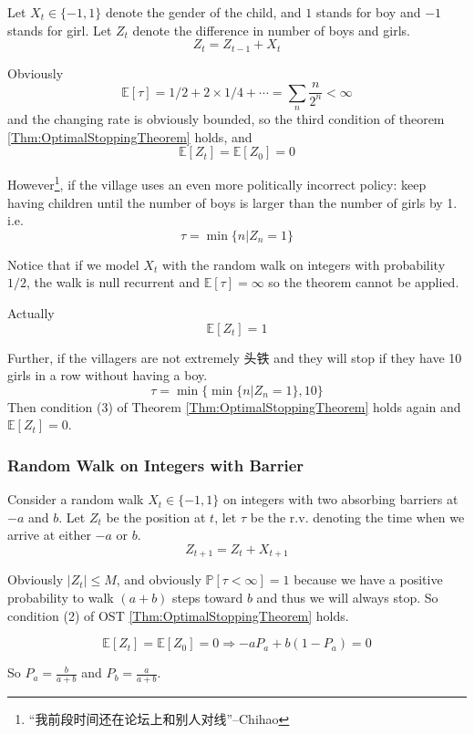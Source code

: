             Let $X_t \in \{-1, 1\}$ denote the gender of the child, and $1$ stands for boy and $-1$ stands for girl. Let $Z_t$ denote the difference in number of boys and girls.
            \[ Z_t = Z_{t-1} + X_t \]

            Obviously
            \[ \mathbb{E}[\tau] = 1/2 + 2 \times 1/4 + \cdots = \sum_n \frac{n}{2^n} < \infty \]
            and the changing rate is obviously bounded, so the third condition of theorem \ref{Thm:OptimalStoppingTheorem} holds, and
            \[ \mathbb{E}[Z_t] = \mathbb{E}[Z_0] = 0 \]

            However\footnote{“我前段时间还在论坛上和别人对线”--Chihao}, if the village uses an even more politically incorrect policy: keep having children until the number of boys is larger than the number of girls by 1. i.e.
            \[ \tau = \min\{n|Z_n=1\} \]
            
            Notice that if we model $X_t$ with the random walk on integers with probability $1/2$, the walk is null recurrent and $\mathbb{E}[\tau] = \infty$ so the theorem cannot be applied.
            
            Actually
            \[ \mathbb{E}[Z_t] = 1 \]

            Further, if the villagers are not extremely 头铁 and they will stop if they have 10 girls in a row without having a boy.
            \[ \tau = \min\{\min\{n|Z_n=1\}, 10\} \]
            Then condition (3) of Theorem \ref{Thm:OptimalStoppingTheorem} holds again and $\mathbb{E}[Z_t] = 0$.

        \subsubsection{Random Walk on Integers with Barrier}
            Consider a random walk $X_t \in \{-1, 1\}$ on integers with two absorbing barriers at $-a$ and $b$. Let $Z_t$ be the position at $t$, let $\tau$ be the r.v. denoting the time when we arrive at either $-a$ or $b$.
            \[ Z_{t+1} = Z_t + X_{t+1} \]

            Obviously $|Z_t| \le M$, and obviously $\mathbb{P}[\tau < \infty]=1$ because we have a positive probability to walk $(a+b)$ steps toward $b$ and thus we will always stop. So condition (2) of OST \ref{Thm:OptimalStoppingTheorem} holds.

            \[ \mathbb{E}[Z_t] = \mathbb{E}[Z_0] = 0 \Rightarrow -aP_a + b(1-P_a) = 0 \]

            So $P_a = \frac{b}{a+b}$ and $P_b = \frac{a}{a+b}$.

